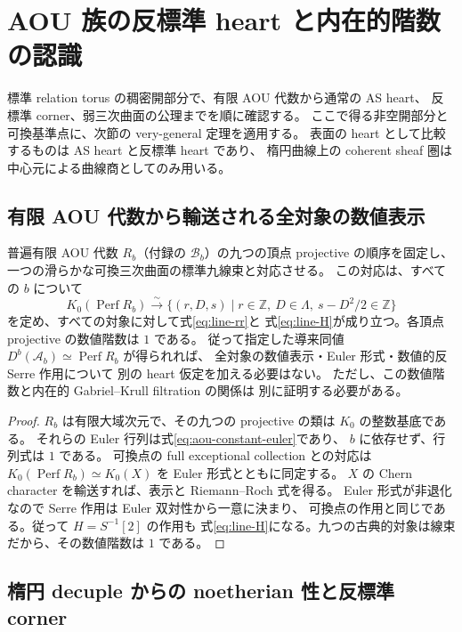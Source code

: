 \section{AOU 族の反標準 heart と内在的階数の認識}
\label{sec:aou-heart-recognition}

標準 relation torus の稠密開部分で、有限 AOU 代数から通常の AS heart、
反標準 corner、弱三次曲面の公理までを順に確認する。
ここで得る非空開部分と可換基準点に、次節の very-general 定理を適用する。
表面の heart として比較するものは AS heart と反標準 heart であり、
楕円曲線上の coherent sheaf 圏は中心元による曲線商としてのみ用いる。

\subsection{有限 AOU 代数から輸送される全対象の数値表示}

\begin{proposition}
\label{prop:aou-full-rr-transport}
普遍有限 AOU 代数 $R_b$（付録の $\mathscr B_b$）の九つの頂点 projective の順序を固定し、
一つの滑らかな可換三次曲面の標準九線束と対応させる。
この対応は、すべての $b$ について
\[
 K_0(\operatorname{Perf}R_b)\xrightarrow{\sim}
 \bigl\{(r,D,s)\mid r\in\mathbb Z,\ D\in\Lambda,
                    \ s-D^2/2\in\mathbb Z\bigr\}
\]
を定め、すべての対象に対して式\eqref{eq:line-rr}と
式\eqref{eq:line-H}が成り立つ。各頂点 projective の数値階数は $1$ である。
従って指定した導来同値
$D^b(\mathcal A_b)\simeq\operatorname{Perf}R_b$ が得られれば、
全対象の数値表示・Euler 形式・数値的反 Serre 作用について
別の heart 仮定を加える必要はない。
ただし、この数値階数と内在的 Gabriel--Krull filtration の関係は
別に証明する必要がある。
\end{proposition}
\begin{proof}
$R_b$ は有限大域次元で、その九つの projective の類は $K_0$ の整数基底である。
それらの Euler 行列は式\eqref{eq:aou-constant-euler}であり、
$b$ に依存せず、行列式は $1$ である。
可換点の full exceptional collection との対応は
$K_0(\operatorname{Perf}R_b)\simeq K_0(X)$ を Euler 形式とともに同定する。
$X$ の Chern character を輸送すれば、表示と Riemann--Roch 式を得る。
Euler 形式が非退化なので Serre 作用は Euler 双対性から一意に決まり、
可換点の作用と同じである。従って $H=S^{-1}[2]$ の作用も
式\eqref{eq:line-H}になる。九つの古典的対象は線束だから、その数値階数は $1$ である。
\end{proof}

\subsection{楕円 decuple からの noetherian 性と反標準 corner}
\label{sec:aou-elliptic-corner}

